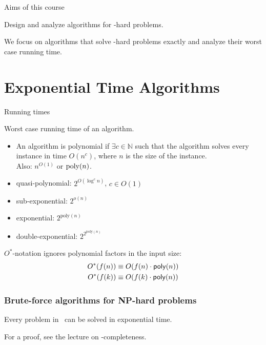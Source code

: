\begin{frame}{Aims of this course}
 
 \centering
 Design and analyze algorithms for \NP-hard problems.
 
 \bigskip
 
 \centering
 We focus on algorithms that solve \NP-hard problems \alert{exactly} and analyze their \alert{worst case running time}.
\end{frame}

\section{Exponential Time Algorithms}

\begin{frame}{Running times}

Worst case running time of an algorithm.
\begin{itemize}
 \item An algorithm is \alert{polynomial} if $\exists c\in \mathbb{N}$ such that the algorithm solves every instance in time $O(n^c)$, where $n$ is the size of the instance.\\
 Also: $n^{O(1)}$ or $\text{\normalfont {poly}}(n)$.
 \item \alert{quasi-polynomial}: $2^{O(\log^c n)}$, $c\in O(1)$
 \item \alert{sub-exponential}: $2^{o(n)}$
 \item \alert{exponential}: $2^{\text{poly}(n)}$
 \item \alert{double-exponential}: $2^{2^{\text{poly}(n)}}$
\end{itemize}

\medskip
$O^*$-notation ignores polynomial factors in the input size:
\begin{align*}
 O^*(f(n)) &\equiv O(f(n) \cdot \mathsf{poly}(n))\\
 O^*(f(k)) &\equiv O(f(k) \cdot \mathsf{poly}(n))
\end{align*}

\end{frame}

\begin{frame}
 \frametitle{Brute-force algorithms for NP-hard problems}

 \begin{theorem}
  Every problem in \NP\ can be solved in exponential time.
 \end{theorem}
 \pause{}
 For a proof, see the lecture on \NP-completeness.
\end{frame}

